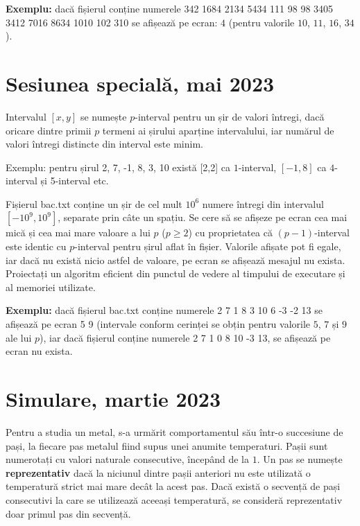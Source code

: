 \documentclass[10pt, a4paper]{article}
\newcommand{\highlight}[1]{{\ttfamily\color{red}#1}}
\begin{document}
\vspace{0.2cm}
\noindent \textbf{Exemplu:} dacă fișierul conține numerele \highlight{342 1684 2134 5434 111 98 98 3405 3412 7016 8634 1010 102 310} se afișează pe ecran: \highlight{$4$} (pentru valorile \highlight{$10$}, \highlight{$11$}, \highlight{$16$}, \highlight{$34$}).


\section{Sesiunea specială, mai 2023}
Intervalul \highlight{$[x,y]$} se numește \highlight{$p$}-interval pentru un șir de valori întregi, dacă oricare dintre primii \highlight{$p$} termeni ai șirului aparține intervalului, iar numărul de valori întregi distincte din interval este minim.

\vspace{0.2cm}
Exemplu: pentru șirul \highlight{2, 7, -1, 8, 3, 10} există [2,2] ca \highlight{$1$}-interval, \highlight{$[-1,8]$} ca \highlight{$4$}-interval și 5-interval etc.

\vspace{0.2cm}
Fișierul \highlight{bac.txt} conține un șir de cel mult \highlight{$10^6$} numere întregi din intervalul \highlight{$[-10^9,10^9]$}, separate prin câte un spațiu. Se cere să se afișeze pe ecran cea mai mică și cea mai mare valoare a lui \highlight{$p$} (\highlight{$p\geq2$}) cu proprietatea că \highlight{$(p-1)$}-interval este identic cu \highlight{$p$}-interval pentru șirul aflat în fișier. Valorile afișate pot fi egale, iar dacă nu există nicio astfel de valoare, pe ecran se afișează mesajul \highlight{nu exista}. Proiectați un algoritm eficient din punctul de vedere al timpului de executare și al memoriei utilizate.

\vspace{0.2cm}
\textbf{Exemplu:} dacă fișierul \highlight{bac.txt} conține numerele \highlight{2 7 1 8 3 10 6 -3 -2 13} se afișează pe ecran \highlight{5 9} (intervale conform cerinței se obțin pentru valorile \highlight{$5$}, \highlight{$7$} și \highlight{$9$} ale lui \highlight{$p$}), iar dacă fișierul conține numerele \highlight{2 7 1 0 8 10 -3 13}, se afișează pe ecran \highlight{nu exista}.


\section{Simulare, martie 2023}
Pentru a studia un metal, s-a urmărit comportamentul său într-o succesiune de pași, la fiecare pas metalul fiind supus unei anumite temperaturi. Pașii sunt numerotați cu valori naturale consecutive, începând de la \highlight{$1$}. Un pas se numește \textbf{reprezentativ} dacă la niciunul dintre pașii anteriori nu este utilizată o temperatură strict mai mare decât la acest pas. Dacă există o secvență de pași consecutivi la care se utilizează aceeași temperatură, se consideră reprezentativ doar primul pas din secvență.
\end{document}
